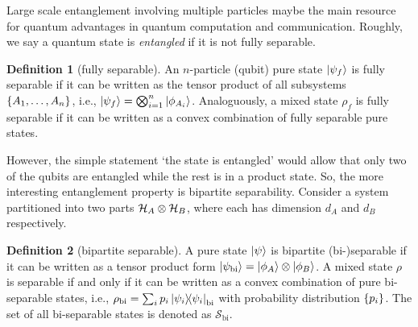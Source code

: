 \documentclass[
reprint,
aps,
pra,
floatfix,
]{revtex4-2}
\theoremstyle{plain}
\theoremstyle{definition}
\newtheorem{definition}{Definition}
\newcommand{\dm}{\rho}
\newcommand{\bi}{\text{bi}}
\newcommand{\separable}{\mathcal{S}}
\newcommand{\ppartition}{\mathcal{P}}
\begin{document}
Large scale entanglement involving multiple particles maybe the main resource for quantum advantages in quantum computation and communication.
Roughly, we say a quantum state is \emph{entangled} if it is not fully separable.
\begin{definition}[fully separable]\label{def:fully_separable}
	An $n$-particle (qubit) pure state $\ket{\psi_f}$ is fully separable 
	if it can be written as the tensor product of all subsystems $\qty{A_1,\dots,A_n}$, i.e., $\ket{\psi_f}=\bigotimes_{i=1}^n \ket{\phi_{A_i}}$.
	Analoguously, a mixed state $\dm_f$  is fully separable if it can be written as a convex combination of fully separable pure states.
\end{definition}
However, the simple statement `the state is entangled' would allow that only two of the qubits are entangled while the rest is in a product state.
So, the more interesting entanglement property is bipartite separability.
Consider a system partitioned into two parts $\mathcal{H}_A \otimes \mathcal{H}_B$, where each has dimension $d_A$ and $d_B$ respectively.
\begin{definition}[bipartite separable]\label{def:bipartite_separable}
	A pure state $\ket{\psi}$ is bipartite (bi-)separable if it can be written as a tensor product form 
	$\ket{\psi_{\bi}} = \ket{\phi_{A}}\otimes\ket{\phi_{B}}$. 
	A mixed state $\dm$ is separable if and only if it can be written as a convex combination of pure bi-separable states, i.e.,
	$\dm_{\bi}=\sum_i p_i \op{\psi_i}_\bi$ 
	with probability distribution $\qty{p_i}$.
	The set of all bi-separable states is denoted as $\separable_\bi$.
\end{definition}
\end{document}
